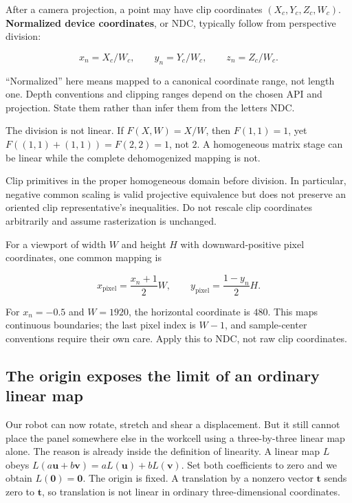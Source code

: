 \hypertarget{01-foundations-i-ch018-ndc-is-not-unit-vector-normalization}{}

After a camera projection, a point may have clip coordinates \((X_c,Y_c,Z_c,W_c)\). \textbf{Normalized device coordinates}, or NDC, typically follow from perspective division:

\[
x_n=X_c/W_c,\qquad y_n=Y_c/W_c,\qquad z_n=Z_c/W_c.
\]

``Normalized'' here means mapped to a canonical coordinate range, not length one. Depth conventions and clipping ranges depend on the chosen API and projection. State them rather than infer them from the letters NDC.

The division is not linear. If \(F(X,W)=X/W\), then \(F(1,1)=1\), yet \(F((1,1)+(1,1))=F(2,2)=1\), not \(2\). A homogeneous matrix stage can be linear while the complete dehomogenized mapping is not.

Clip primitives in the proper homogeneous domain before division. In particular, negative common scaling is valid projective equivalence but does not preserve an oriented clip representative's inequalities. Do not rescale clip coordinates arbitrarily and assume rasterization is unchanged.

For a viewport of width \(W\) and height \(H\) with downward-positive pixel coordinates, one common mapping is

\[
x_{\mathrm{pixel}}=\frac{x_n+1}{2}W,\qquad
y_{\mathrm{pixel}}=\frac{1-y_n}{2}H.
\]

For \(x_n=-0.5\) and \(W=1920\), the horizontal coordinate is \(480\). This maps continuous boundaries; the last pixel index is \(W-1\), and sample-center conventions require their own care. Apply this to NDC, not raw clip coordinates.

\subsection{The origin exposes the limit of an ordinary linear map}\label{01-foundations-i-ch018-the-origin-exposes-the-limit-of-an-ordinary-linear-map}

\hypertarget{01-foundations-i-ch018-the-origin-exposes-the-limit-of-an-ordinary-linear-map}{}

Our robot can now rotate, stretch and shear a displacement. But it still cannot place the panel somewhere else in the workcell using a three-by-three linear map alone. The reason is already inside the definition of linearity. A linear map \(L\) obeys \(L(a\mathbf u+b\mathbf v)=aL(\mathbf u)+bL(\mathbf v)\). Set both coefficients to zero and we obtain \(L(\mathbf0)=\mathbf0\). The origin is fixed. A translation by a nonzero vector \(\mathbf t\) sends zero to \(\mathbf t\), so translation is not linear in ordinary three-dimensional coordinates.

